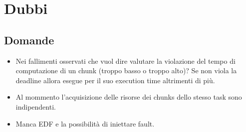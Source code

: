 \chapter{Dubbi}

\section{Domande}
\begin{itemize}
    \item  Nei fallimenti osservati che vuol dire valutare la violazione del tempo di computazione di un chunk (troppo basso o troppo alto)? Se non viola la deadline allora esegue per il suo execution time altrimenti di più.
    \item Al mommento l'acquisizione delle risorse dei chunks dello stesso task sono indipendenti.
    \item Manca EDF e la possibilità di iniettare fault.
\end{itemize}